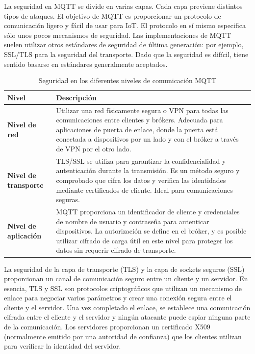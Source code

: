La seguridad en MQTT se divide en varias capas. Cada capa previene distintos tipos de ataques. El objetivo de MQTT es proporcionar un protocolo de comunicación ligero y fácil de usar para IoT. El protocolo en sí mismo especifica sólo unos pocos mecanismos de seguridad. Las implementaciones de MQTT suelen utilizar otros estándares de seguridad de última generación: por ejemplo, SSL/TLS para la seguridad del transporte. Dado que la seguridad es difícil, tiene sentido basarse en estándares generalmente aceptados.\cite{hivemq_mqtt_security}
\begin{table}[ht]
\centering
\begin{tabular}{|l|p{10cm}|}
\hline
\textbf{Nivel} & \textbf{Descripción}  \\ \hline
\textbf{Nivel de red} & Utilizar una red físicamente segura o VPN para todas las comunicaciones entre clientes y brókers. Adecuada para aplicaciones de puerta de enlace, donde la puerta está conectada a dispositivos por un lado y con el bróker a través de VPN por el otro lado. \\ \hline
\textbf{Nivel de transporte} & TLS/SSL se utiliza para garantizar la confidencialidad y autenticación durante la transmisión. Es un método seguro y comprobado que cifra los datos y verifica las identidades mediante certificados de cliente. Ideal para comunicaciones seguras. \\ \hline
\textbf{Nivel de aplicación} & MQTT proporciona un identificador de cliente y credenciales de nombre de usuario y contraseña para autenticar dispositivos. La autorización se define en el bróker, y es posible utilizar cifrado de carga útil en este nivel para proteger los datos sin requerir cifrado de transporte. \\ \hline
\end{tabular}
\caption{Seguridad en los diferentes niveles de comunicación MQTT}
\end{table}

La seguridad de la capa de transporte (TLS) y la capa de sockets seguros (SSL) proporcionan un canal de comunicación seguro entre un cliente y un servidor. En esencia, TLS y SSL son protocolos criptográficos que utilizan un mecanismo de enlace para negociar varios parámetros y crear una conexión segura entre el cliente y el servidor. Una vez completado el enlace, se establece una comunicación cifrada entre el cliente y el servidor y ningún atacante puede espiar ninguna parte de la comunicación. Los servidores proporcionan un certificado X509 (normalmente emitido por una autoridad de confianza) que los clientes utilizan para verificar la identidad del servidor.

